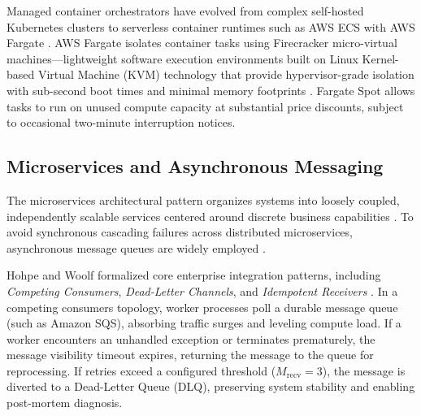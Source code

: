 \documentclass[conference]{IEEEtran}
\begin{document}
Managed container orchestrators have evolved from complex self-hosted Kubernetes clusters to serverless container runtimes such as AWS ECS with AWS Fargate \cite{burns}. AWS Fargate isolates container tasks using Firecracker micro-virtual machines—lightweight software execution environments built on Linux Kernel-based Virtual Machine (KVM) technology that provide hypervisor-grade isolation with sub-second boot times and minimal memory footprints \cite{agache}. Fargate Spot allows tasks to run on unused compute capacity at substantial price discounts, subject to occasional two-minute interruption notices.

\subsection{Microservices and Asynchronous Messaging}
The microservices architectural pattern organizes systems into loosely coupled, independently scalable services centered around discrete business capabilities \cite{fowler, newman}. To avoid synchronous cascading failures across distributed microservices, asynchronous message queues are widely employed \cite{taibi}.

Hohpe and Woolf formalized core enterprise integration patterns, including \textit{Competing Consumers}, \textit{Dead-Letter Channels}, and \textit{Idempotent Receivers} \cite{hohpe}. In a competing consumers topology, worker processes poll a durable message queue (such as Amazon SQS), absorbing traffic surges and leveling compute load. If a worker encounters an unhandled exception or terminates prematurely, the message visibility timeout expires, returning the message to the queue for reprocessing. If retries exceed a configured threshold ($M_{\text{recv}} = 3$), the message is diverted to a Dead-Letter Queue (DLQ), preserving system stability and enabling post-mortem diagnosis.
\end{document}
